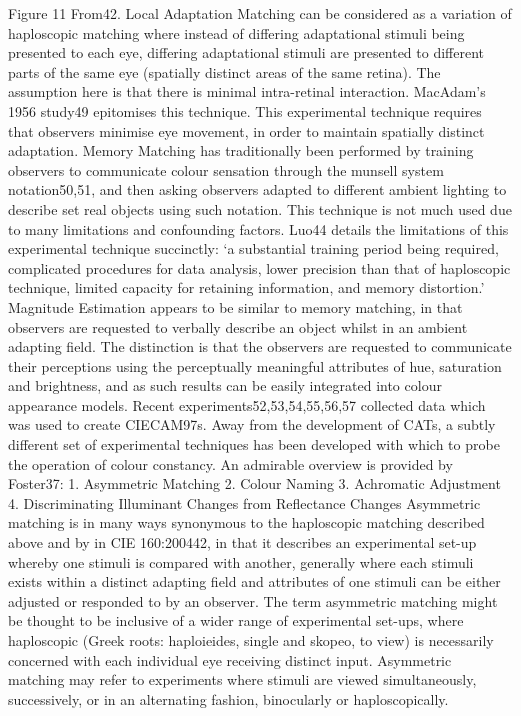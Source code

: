 Figure 11 From42.
Local Adaptation Matching can be considered as a variation of haploscopic matching where instead of differing adaptational stimuli being presented to each eye, differing adaptational stimuli are presented to different parts of the same eye (spatially distinct areas of the same retina). The assumption here is that there is minimal intra-retinal interaction. MacAdam's 1956 study49 epitomises this technique. This experimental technique requires that observers minimise eye movement, in order to maintain spatially distinct adaptation.
Memory Matching has traditionally been performed by training observers to communicate colour sensation through the munsell system notation50,51, and then asking observers adapted to different ambient lighting to describe set real objects using such notation. This technique is not much used due to many limitations and confounding factors. Luo44 details the limitations  of this experimental technique succinctly: `a substantial training period being required, complicated procedures for data analysis, lower precision than that of haploscopic technique, limited capacity for retaining information, and memory distortion.'
Magnitude Estimation appears to be similar to memory matching, in that observers are requested to verbally describe an object whilst in an ambient adapting field. The distinction is that the observers are requested to communicate their perceptions using the perceptually meaningful attributes of hue, saturation and brightness, and as such results can be easily integrated into colour appearance models. Recent experiments52,53,54,55,56,57 collected data which was used to create CIECAM97s.
Away from the development of CATs, a subtly different set of experimental techniques has been developed with which to probe the operation of colour constancy. An admirable overview is provided by Foster37:
1.	Asymmetric Matching
2.	Colour Naming
3.	Achromatic Adjustment
4.	Discriminating Illuminant Changes from Reflectance Changes
Asymmetric matching is in many ways synonymous to the haploscopic matching described above and by in CIE 160:200442, in that it describes an experimental set-up whereby one stimuli is compared with another, generally where each stimuli exists within a distinct adapting field and attributes of one stimuli can be either adjusted or responded to by an observer. The term asymmetric matching might be thought to be inclusive of a wider range of experimental set-ups, where haploscopic (Greek roots: haploieides, single and skopeo, to view) is necessarily concerned with each individual eye receiving distinct input. Asymmetric matching may refer to experiments where stimuli are viewed simultaneously, successively, or in an alternating fashion, binocularly or haploscopically.
